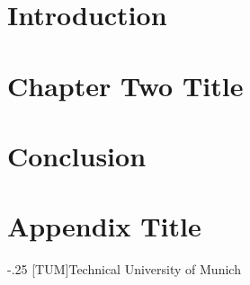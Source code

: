 \documentclass[headsepline,footsepline,footinclude=True,oneside,fontsize=11pt,paper=a4,listof=totoc,bibliography=totoc]{scrbook} %
\begin{document}


\frontmatter{}






\tableofcontents{}

\mainmatter{}


\chapter{Introduction}


\chapter{Chapter Two Title}


%

\chapter{Conclusion}


\appendix
\chapter{Appendix Title}


\appendix{}


\begin{acronym}
	\itemsep-.25\baselineskip
	[TUM]{Technical University of Munich}
\end{acronym}

\listoffigures{}
\listoftables{}
\printbibliography{}
\end{document}
